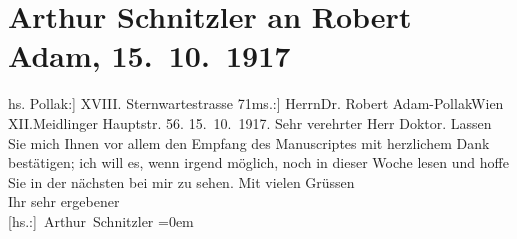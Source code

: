 

         
         \renewcommand{\erwaehntePersonen}{Personen: Robert Adam, Frieda Pollak}
         \renewcommand{\erwaehnteOrte}{Orte: Meidlinger Hauptstraße, Sternwartestraße 71, Wien, XII., Meidling}
         \renewcommand{\erwaehnteWerke}{Werke: Das Ende des Judas}
               \section[Arthur Schnitzler an Robert Adam, 15. 10. 1917]{ Arthur Schnitzler an Robert Adam, 15. 10. 1917}\nopagebreak{}\rehead{ }\begin{ledgroupsized}[t]{13cm}\normalsize\beginnumbering{} \toendnotes[C]{\smallbreak\pagebreak[2]} 
\toendnotes[C]{\smallbreak}\pstart{}{\pb}{[}hs. Pollak:{]} XVIII. Sternwartestrasse 71\pend{}{\bigskip}\pstart{}{[}ms.:{]} Herrn\pend{}\pstart{}Dr. Robert Adam-\pend{}\pstart{}Pollak\pend{}\pstart{}Wien XII.\pend{}\pstart{}Meidlinger Hauptstr. 56.\pend{}{\bigskip}\pstart
           \raggedleft{}{\pb}15. 10. 1917.\pend
           \pstart{}Sehr verehrter Herr Doktor.\pend\pstart
           Lassen Sie mich Ihnen vor allem den Empfang des Manuscriptes mit herzlichem Dank bestätigen; ich will es,
               wenn irgend möglich, noch in dieser Woche lesen und hoffe Sie in der nächsten bei mir
               zu sehen.\pend
           \pstart
           Mit vielen Grüssen{\\[\baselineskip]}Ihr sehr ergebener{\\[\baselineskip]}\spacefill\mbox{{[}hs.:{]} Arthur Schnitzler}\pend
           \leftskip=0em{}
         
         \endnumbering{}\end{ledgroupsized}  \newcommand{\dateiname}{L02276}\newcommand{\titel}{Arthur Schnitzler an Robert Adam, 15. 10. 1917}\newcommand{\editorInnen}{Martin Anton Müller und Gerd-Hermann Susen}
      